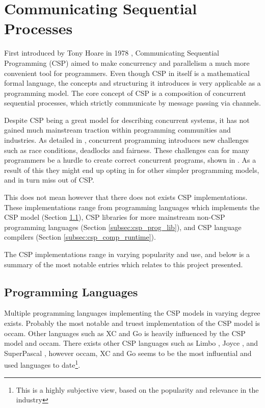 \section{Communicating Sequential Processes}
\label{sec:csp}

First introduced by Tony Hoare in 1978 \citep{csp}, Communicating Sequential Programming (CSP) aimed to make concurrency and parallelism a much more convenient tool for programmers. Even though CSP in itself is a mathematical formal language, the concepts and structuring it introduces is very applicable as a programming model. The core concept of CSP is a composition of concurrent sequential processes, which strictly communicate by message passing via channels.

Despite CSP being a great model for describing concurrent systems, it has not gained much mainstream traction within programming communities and industries. As detailed in \citet{benari2006}, concurrent programming introduces new challenges such as race conditions, deadlocks and fairness. These challenges can for many programmers be a hurdle to create correct concurrent programs, shown in \citet{ousterhour1996}. As a result of this they might end up opting in for other simpler programming models, and in turn miss out of CSP. 

This does not mean however that there does not exists CSP implementations. These implementations range from programming languages which implements the CSP model (Section \ref{subsec:csp_prog_lang}), CSP libraries for more mainstream non-CSP programming languages (Section \ref{subsec:csp_prog_lib}), and CSP language compilers (Section \ref{subsec:csp_comp_runtime}).

The CSP implementations range in varying popularity and use, and below is a summary of the most notable entries which relates to this project presented.


\subsection{Programming Languages}
\label{subsec:csp_prog_lang}

Multiple programming languages implementing the CSP models in varying degree exists. Probably the most notable and truest implementation of the CSP model is occam. Other languages such as XC and Go is heavily influenced by the CSP model and occam. There exists other CSP languages such as Limbo \citep{limbo}, Joyce \citep{joyce}, and SuperPascal \citep{superpascal}, however occam, XC and Go seems to be the most influential and used languages to date\footnote{This is a highly subjective view, based on the popularity and relevance in the industry}. 


